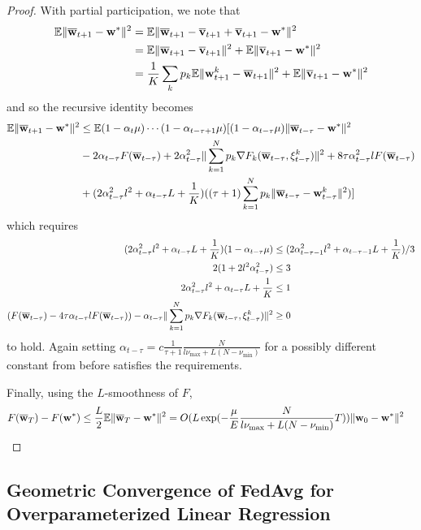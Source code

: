 \begin{proof}
	With partial participation, we note that 
	\begin{align*}
	\mathbb{E}\|{\overline{\mathbf{w}}}_{t+1}-{\mathbf{w}}^{\ast}\|^{2} & =\mathbb{E}\|{\overline{\mathbf{w}}}_{t+1}-{\overline{\mathbf{v}}}_{t+1}+{\overline{\mathbf{v}}}_{t+1}-{\mathbf{w}}^{\ast}\|^{2}\\
	& =\mathbb{E}\|{\overline{\mathbf{w}}}_{t+1}-{\overline{\mathbf{v}}}_{t+1}\|^{2}+\mathbb{E}\|{\overline{\mathbf{v}}}_{t+1}-{\mathbf{w}}^{\ast}\|^{2}\\
	& =\frac{1}{K}\sum_{k}p_{k}\mathbb{E}\|{\mathbf{w}}_{t+1}^{k}-{\overline{\mathbf{w}}}_{t+1}\|^{2}+\mathbb{E}\|{\overline{\mathbf{v}}}_{t+1}-{\mathbf{w}}^{\ast}\|^{2}
	\end{align*}
	and so the recursive identity becomes 
	\begin{align*}
	\mathbb{E}\|{\overline{\mathbf{w}}}_{t+1}-{\mathbf{w}}^{\ast}\|^{2} & \leq\mathbb{E}(1-\alpha_{t}\mu)\cdots(1-\alpha_{t-\tau+1}\mu)[(1-\alpha_{t-\tau}\mu)\|{\overline{\mathbf{w}}}_{t-\tau}-{\mathbf{w}}^{\ast}\|^{2}\\
	& -2\alpha_{t-\tau}F({\overline{\mathbf{w}}}_{t-\tau})+2\alpha_{t-\tau}^{2}\|\sum_{k=1}^{N}p_{k}\nabla F_{k}({\overline{\mathbf{w}}}_{t-\tau},\xi_{t-\tau}^{k})\|^{2}+8\tau\alpha_{t-\tau}^{2}lF({\overline{\mathbf{w}}}_{t-\tau})\\
	& +(2\alpha_{t-\tau}^{2}l^{2}+\alpha_{t-\tau}L+\frac{1}{K})((\tau+1)\sum_{k=1}^{N}p_{k}\|{\overline{\mathbf{w}}}_{t-\tau}-{\mathbf{w}}_{t-\tau}^{k}\|^{2})]
	\end{align*}
	which requires 
	\begin{align*}
	(2\alpha_{t-\tau}^{2}l^{2}+\alpha_{t-\tau}L+\frac{1}{K})(1-\alpha_{t-\tau}\mu) & \leq(2\alpha_{t-\tau-1}^{2}l^{2}+\alpha_{t-\tau-1}L+\frac{1}{K})/3\\
	2(1+2l^{2}\alpha_{t-\tau}^{2}) & \leq3\\
	2\alpha_{t-\tau}^{2}l^{2}+\alpha_{t-\tau}L+\frac{1}{K} & \leq1\\
	(F({\overline{\mathbf{w}}}_{t-\tau})-4\tau\alpha_{t-\tau}lF({\overline{\mathbf{w}}}_{t-\tau}))-\alpha_{t-\tau}\|\sum_{k=1}^{N}p_{k}\nabla F_{k}({\overline{\mathbf{w}}}_{t-\tau},\xi_{t-\tau}^{k})\|^{2} & \geq0
	\end{align*}
	to hold. Again setting $\alpha_{t-\tau}=c\frac{1}{\tau+1}\frac{N}{l\nu_{\max}+L(N-\nu_{\min})}$
	for a possibly different constant from before satisfies the requirements.
	
	Finally, using the $L$-smoothness of $F$, 
	\begin{align*}
	F({\overline{\mathbf{w}}}_{T})-F({\mathbf{w}}^{\ast}) & \leq\frac{L}{2}\mathbb{E}\|{\overline{\mathbf{w}}}_{T}-{\mathbf{w}}^{\ast}\|^{2}=O(L\exp(-\frac{\mu}{E}\frac{N}{l\nu_{\max}+L(N-\nu_{\min})}T))\|{\mathbf{w}}_{0}-{\mathbf{w}}^{\ast}\|^{2}
	\end{align*}
\end{proof}

\subsection{Geometric Convergence of FedAvg for Overparameterized Linear Regression}

